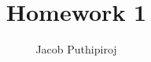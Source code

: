 \documentclass{article}
\begin{document}
\title{Homework 1}
\author{Jacob Puthipiroj}
\maketitle
\end{document}
